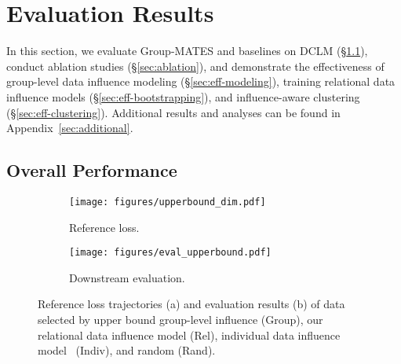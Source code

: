 \section{Evaluation Results}


In this section, we evaluate Group-MATES and baselines on DCLM (§\ref{sec:performance}), conduct ablation studies (§\ref{sec:ablation}), and demonstrate the effectiveness of group-level data influence modeling (§\ref{sec:eff-modeling}), training relational data influence models (§\ref{sec:eff-bootstrapping}), and influence-aware clustering (§\ref{sec:eff-clustering}). Additional results and analyses can be found in Appendix~\ref{sec:additional}.

\subsection{Overall Performance}
\label{sec:performance}

\begin{figure}[t]
    \centering
    \begin{subfigure}{0.218\textwidth}
    \centering
    \texttt{[image: figures/upperbound\_dim.pdf]}
    \caption{Reference loss.}
    \label{fig:upperbound-dim}
    \end{subfigure}
    \begin{subfigure}{0.236\textwidth}
    \centering
    \texttt{[image: figures/eval\_upperbound.pdf]}
    \caption{Downstream evaluation.}
    \label{fig:upperbound-eval}
    \end{subfigure}
    \vspace{-0.35cm}
    \caption{Reference loss trajectories (a) and evaluation results (b) of data selected by upper bound group-level influence (Group), our relational data influence model (Rel), individual data influence model~\cite{yu2024mates} (Indiv), and random (Rand).}
    \vspace{-0.3cm}
    \label{fig:pairwise}
\end{figure}

